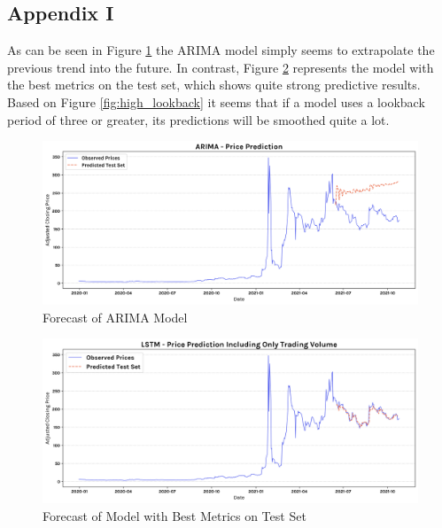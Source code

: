 \documentclass[11pt, a4paper]{article}
\begin{document}
\pagebreak
\subsection{Appendix I}
\label{appendix:Forecast}
As can be seen in Figure \ref{fig:arima_prediction_test_set} the ARIMA model simply seems to extrapolate the previous trend into the future.
In contrast, Figure \ref{fig:model_only_trading_volume_forecast_test_set} represents the model with the best metrics on the test set, which shows quite strong predictive results.
Based on Figure \ref{fig:high_lookback} it seems that if a model uses a lookback period of three or greater, its predictions
will be smoothed quite a lot.

\begin{figure}[!htb]
    \centering
    \includegraphics[width=\textwidth]{prediction_arima_pred.png}
    \caption{Forecast of ARIMA Model}
    \label{fig:arima_prediction_test_set}
\end{figure}

\begin{figure}[!htb]
    \centering
    \includegraphics[width=\textwidth]{only_trading_volume_pred.png}
    \caption{Forecast of Model with Best Metrics on Test Set}
    \label{fig:model_only_trading_volume_forecast_test_set}
\end{figure}
\end{document}

